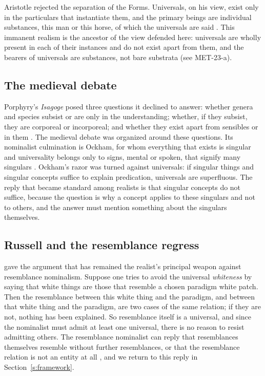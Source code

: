 \documentclass{situationist-preprint}
\begin{document}
Aristotle rejected the separation of the Forms. Universals, on his view, exist only in the particulars that instantiate them, and the primary beings are individual substances, this man or this horse, of which the universals are said \citep{AristotleCategories,AristotleMetaphysics}. This immanent realism is the ancestor of the view defended here: universals are wholly present in each of their instances and do not exist apart from them, and the bearers of universals are substances, not bare substrata (see MET-23-a).

\subsection{The medieval debate}

Porphyry's \emph{Isagoge} posed three questions it declined to answer: whether genera and species subsist or are only in the understanding; whether, if they subsist, they are corporeal or incorporeal; and whether they exist apart from sensibles or in them \citep{PorphyryIsagoge}. The medieval debate was organized around these questions. Its nominalist culmination is Ockham, for whom everything that exists is singular and universality belongs only to signs, mental or spoken, that signify many singulars \citep{OckhamSL}. Ockham's razor was turned against universals: if singular things and singular concepts suffice to explain predication, universals are superfluous. The reply that became standard among realists is that singular concepts do not suffice, because the question is why a concept applies to these singulars and not to others, and the answer must mention something about the singulars themselves.

\subsection{Russell and the resemblance regress}

\citet[ch.~9]{Russell1912} gave the argument that has remained the realist's principal weapon against resemblance nominalism. Suppose one tries to avoid the universal \emph{whiteness} by saying that white things are those that resemble a chosen paradigm white patch. Then the resemblance between this white thing and the paradigm, and between that white thing and the paradigm, are two cases of the same relation; if they are not, nothing has been explained. So resemblance itself is a universal, and since the nominalist must admit at least one universal, there is no reason to resist admitting others. The resemblance nominalist can reply that resemblances themselves resemble without further resemblances, or that the resemblance relation is not an entity at all \citep{Price1953,RodriguezPereyra2002}, and we return to this reply in Section~\ref{s:framework}.
\end{document}
